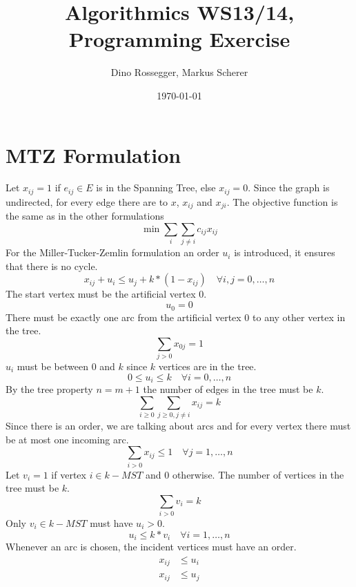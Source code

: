 \documentclass[a4paper]{article}
\title{Algorithmics WS13/14, Programming Exercise}
\author{Dino Rossegger, Markus Scherer}
\date{\today}
\numberwithin{equation}{section}
\begin{document}
\maketitle
\section{MTZ Formulation}
Let $x_{ij}=1$ if $e_{ij}\in E$ is in the Spanning Tree, else $x_{ij}=0$. Since the graph is undirected, for every edge there are to $x$, $x_{ij}$ and $x_{ji}$. The objective function is the same as in the other formulations
\begin{equation}
	\min{\sum_i \sum_{j\not=i} c_{ij}x_{ij}}
\end{equation}
For the Miller-Tucker-Zemlin formulation an order $u_i$ is introduced, it ensures that there is no cycle.
\begin{equation}
x_{ij} + u_i \leq u_j + k*(1-x_{ij}) \quad \forall i,j=0,\dots,n
\end{equation}
The start vertex must be the artificial vertex $0$.
\begin{equation}
	u_0=0
\end{equation}
There must be exactly one arc from the artificial vertex $0$ to any other vertex in the tree.
\begin{equation}
	\sum_{j>0} x_{0j} = 1
\end{equation}
$u_i$ must be between $0$ and $k$ since $k$ vertices are in the tree.
\begin{equation}
0\leq u_i \leq k \quad \forall i=0,\dots,n
\end{equation}
By the tree property $n=m+1$ the number of edges in the tree must be $k$.
\begin{equation}
	\sum_{i\geq0} \sum_{j\geq0,j\not =i} x_{ij} = k
\end{equation}
Since there is an order, we are talking about arcs and for every vertex there must be at most one incoming arc.
\begin{equation}
	\sum_{i>0} x_{ij}\leq 1 \quad \forall j=1,\dots,n
\end{equation}
Let $v_i=1$ if vertex $i \in k-MST$ and $0$ otherwise.
The number of vertices in the tree must be $k$.
\begin{equation}
	\sum_{i>0}v_i=k
\end{equation}
Only $v_i \in k-MST$ must have $u_i>0$.
\begin{equation}
	u_i \leq k*v_i	\quad \forall i=1,\dots,n
\end{equation}
Whenever an arc is chosen, the incident vertices must have an order.
\begin{align}
	x_{ij} &\leq u_i \\
	x_{ij} &\leq u_j 
\end{align}
\end{document}

